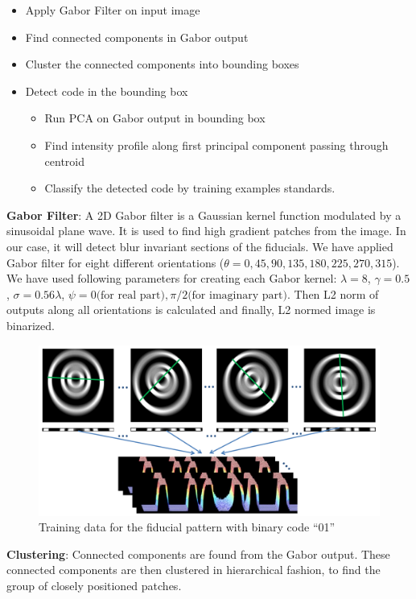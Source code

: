 \documentclass[runningheads]{llncs}
\begin{document}
\begin{itemize}
  \item Apply Gabor Filter on input image
  \item Find connected components in Gabor output
  \item Cluster the connected components into bounding boxes
  \item Detect code in the bounding box
  \begin{itemize}
    \item Run PCA on Gabor output in bounding box
    \item Find intensity profile along first principal component passing through
    centroid
    \item Classify the detected code by training examples
    standards.
  \end{itemize}
\end{itemize}

\textbf{Gabor Filter}: A 2D Gabor filter is a Gaussian kernel function modulated
by a sinusoidal plane wave. It is used to find high gradient patches from the
image. In our case, it will detect blur invariant sections of the fiducials. We
have applied Gabor filter for eight different orientations ($\theta = 0, 45,
90, 135, 180, 225, 270, 315$). We have used following parameters for
creating each Gabor kernel: $\lambda = 8$, $\gamma = 0.5$, $\sigma =
0.56\lambda$, $\psi = 0 \text{(for real part)}, \pi/2 \text{(for imaginary
part)}$.
Then L2 norm of outputs along all orientations is calculated and finally, L2
normed image is binarized.

\begin{figure}
\centering
  \includegraphics[width=\linewidth]{training_data.pdf}  
  \caption{Training data for the fiducial pattern with binary code ``01''}
\end{figure}

\textbf{Clustering}: Connected components are found from the Gabor output.
These connected components are then clustered in hierarchical fashion, to find
the group of closely positioned patches.
\end{document}
